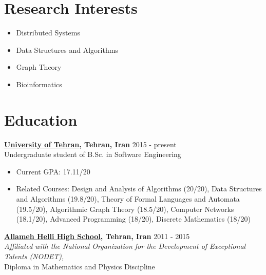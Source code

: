 \documentclass[margin]{res}
\begin{document}
 
 
 
\address{No. 14, Tanhajou Street, \\Tehranpars 3rd Square, \\Tehran, Iran, 1653984753}
\address{Cell: +98-919-6421171 \\ \href{mailto:shayan.hosseini@ut.ac.ir}{\texttt{shayan.hosseini@ut.ac.ir}} \\ 
		\href{http://www.shayanh.ir}{\texttt{http://www.shayanh.ir}}}

 
\begin{resume}

\section{Research Interests}
\begin{itemize}[leftmargin=0mm]
	\item Distributed Systems
	\item Data Structures and Algorithms
	\item Graph Theory
	\item Bioinformatics
\end{itemize}

\section{Education}
    {\bf \href{http://ut.ac.ir/en}{University of Tehran}, Tehran, Iran} \hfill 2015 - present
    \\Undergraduate student of B.Sc. in Software Engineering
    
   	\begin{itemize}
	\item Current GPA: 17.11/20
	\item Related Courses: Design and Analysis of Algorithms (20/20), Data Structures and Algorithms (19.8/20),
	Theory of Formal Languages and Automata (19.5/20), Algorithmic Graph Theory (18.5/20), Computer Networks (18.1/20),
	Advanced Programming (18/20), Discrete Mathematics (18/20)
	\end{itemize}

    {\bf \href{http://www.helli.ir/}{Allameh Helli High School}, Tehran, Iran} \hfill 2011 - 2015
    \\\textit{\scriptsize Affiliated with the National Organization for the Development of Exceptional Talents (NODET),}
    \\Diploma in Mathematics and Physics Discipline


\end{resume}
\end{document}
